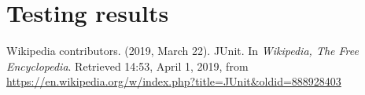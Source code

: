 \documentclass[a4paper]{report}
\begin{document}
\section{Testing results}
% 
% 
% 
\begin{thebibliography}{A}

Wikipedia contributors. (2019, March 22). JUnit. In \emph{Wikipedia, The Free Encyclopedia}. Retrieved 14:53, April 1, 2019, from \url{https://en.wikipedia.org/w/index.php?title=JUnit&oldid=888928403}

\end{thebibliography}
\end{document}

